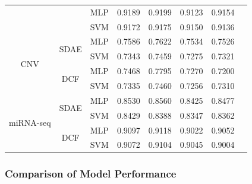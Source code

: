 \begin{table}[h!]
{\begin{tabular}{|c|c|c| c c c c |c|}
                            &                             & MLP  & 0.9189 &	0.9199 & 0.9123 & 0.9154  \\
                            &                             & SVM  & 0.9172 &	0.9175 & 0.9150 & 0.9136  \\
        \hline
        \multirow{4}{*}{CNV} & \multirow{2}{*}{SDAE}      & MLP & 0.7586 &	0.7622 & 0.7534 & 0.7526   \\
                            &                             & SVM & 0.7343 &	0.7459 & 0.7275 & 0.7321  \\
                                   \cline{2-7}
                                 & \multirow{2}{*}{DCF}   & MLP & 0.7468 &	0.7795 & 0.7270 & 0.7200   \\
                            &                             & SVM & 0.7335 &	0.7460 & 0.7256 & 0.7310  \\
        \hline
        \multirow{4}{*}{miRNA-seq} & \multirow{2}{*}{SDAE}  & MLP & 0.8530 &	0.8560 & 0.8425 & 0.8477   \\
                            &                             & SVM & 0.8429 &	0.8388 & 0.8347 & 0.8362  \\
                                   \cline{2-7}
                                 & \multirow{2}{*}{DCF}   & MLP & 0.9097 & 0.9118 & 0.9022 & 0.9052   \\
                            &                             & SVM & 0.9072 &	0.9104 & 0.9045 & 0.9004  \\
        \hline
    \end{tabular}}
\end{table}

\subsubsection{Comparison of Model Performance} 

